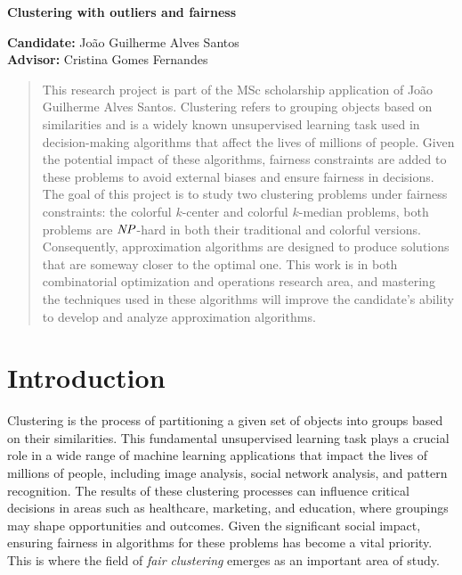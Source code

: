 \documentclass[12pt]{article}
\begin{document}
\begin{center}
  
{\Large {\bf Clustering with outliers and fairness} 

}

\vspace{0.2cm}
{\small 
{\bf Candidate:} João Guilherme Alves Santos \\
{\bf Advisor:} Cristina Gomes Fernandes
}

\vspace{5mm} 

\begin{abstract}
This research project is part of the MSc scholarship application of João Guilherme Alves Santos.
Clustering refers to grouping objects based on similarities and is a widely known unsupervised learning task used in decision-making algorithms that affect the lives of millions of people.
Given the potential impact of these algorithms, fairness constraints are added to these problems to avoid external biases and ensure fairness in decisions.
The goal of this project is to study two clustering problems under fairness constraints: the colorful $k$-center and colorful $k$-median problems, both problems are $\mathit{NP}$-hard in both their traditional and colorful versions.
Consequently, approximation algorithms are designed to produce solutions that are someway closer to the optimal one.
This work is in both combinatorial optimization and operations research area, and mastering the techniques used in these algorithms will improve the candidate's ability to develop and analyze approximation algorithms.
\end{abstract}

\end{center}

\section{Introduction}
Clustering is the process of partitioning a given set of objects into groups based on their similarities. 
This fundamental unsupervised learning task plays a crucial role in a wide range of machine learning applications that impact the lives of millions of people, including image analysis, social network analysis, and pattern recognition. 
The results of these clustering processes can influence critical decisions in areas such as healthcare, marketing, and education, where groupings may shape opportunities and outcomes.
Given the significant social impact, ensuring fairness in algorithms for these problems has become a vital priority. 
This is where the field of \emph{fair clustering} emerges as an important area of study.
\end{document}
